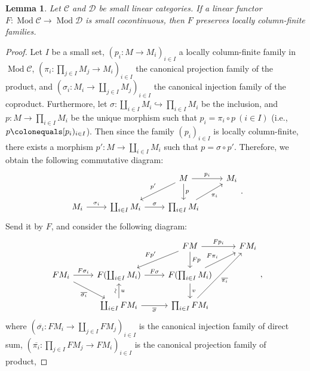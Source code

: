 \documentclass{surv-l}
\numberwithin{equation}{chapter}
\numberwithin{figure}{chapter}
\theoremstyle{plain}
\newtheorem{lem}[thm]{Lemma}
\theoremstyle{definition}
\theoremstyle{remark}
\newcommand{\Ar}[3]{\ar[from={#1}, to={#2}, #3]}
\DeclareMathOperator{\Mod}{Mod}
\begin{document}
\begin{lem}\label{lem:coconti-preserve-loc-fin}
Let ${\mathcal{C}}$ and ${\mathcal{D}}$ be small linear categories.
If a linear functor $F \colon \Mod{\mathcal{C}} \to \Mod{\mathcal{D}}$ is small cocontinuous, then
$F$ preserves locally column-finite families.
\end{lem}

\begin{proof}
Let $I$ be a small set,
$(p_i \colon M \to M_i)_{i\in I}$ a locally column-finite family in $\Mod{\mathcal{C}}$,
$(\pi_i \colon \prod_{j\in I}M_j \to M_i)_{i\in I}$ the canonical projection family of
the product, and
$(\sigma_i \colon M_i \to \coprod_{j\in I}M_j)_{i\in I}$ the canonical injection family
of the coproduct.
Furthermore, let
$\sigma \colon \coprod_{i\in I}M_i \hookrightarrow \prod_{i\in I}M_i$
be the inclusion, and
$p \colon M \to \prod_{i\in I}M_i$ be
the unique morphism such that $p_i = \pi_i \circ p\ (i \in I)$
(i.e., $p\colonequals  [p_i)_{i\in I}$). Then since the family $(p_i)_{i\in I}$ is locally column-finite,
there exists a morphism $p'\colon M \to \coprod_{i\in I}M_i$ such that
$p = \sigma \circ p'$.
Therefore, we obtain the following commutative diagram:
\[
\begin{tikzcd}
& & M & M_i\\
M_i & \coprod_{i\in I}M_i & \prod_{i\in I}M_i
\Ar{1-3}{1-4}{"p_i"}
\Ar{1-3}{2-2}{"p'" '}
\Ar{1-3}{2-3}{"p"}
\Ar{2-1}{2-2}{"\sigma_i"}
\Ar{2-2}{2-3}{"\sigma"}
\Ar{2-3}{1-4}{"\pi_i" '}
\end{tikzcd}.
\]
Send it by $F$, and consider the following diagram:
\begin{equation}\label{eq:kakudaizusiki}
\begin{tikzcd}
& & FM & FM_i\\
FM_i & F(\coprod_{i\in I}M_i) & F(\prod_{i\in I}M_i)\\
& \coprod_{i\in I}FM_i & \prod_{i\in I}FM_i
\Ar{1-3}{1-4}{"Fp_i"}
\Ar{1-3}{2-2}{"Fp'" '}
\Ar{1-3}{2-3}{"Fp"}
\Ar{2-1}{2-2}{"F\sigma_i"}
\Ar{2-2}{2-3}{"F\sigma"}
\Ar{2-3}{1-4}{"F\pi_i"}
\Ar{2-1}{3-2}{"\overline{\sigma_i}" '}
\Ar{3-2}{3-3}{"\overline{\sigma}" '}
\Ar{3-3}{1-4}{"\overline{\pi_i}" '}
\Ar{3-2}{2-2}{"u" ', "\rotatebox{90}{$\sim$}"}
\Ar{2-3}{3-3}{"v"}
\end{tikzcd},
\end{equation}
where $(\overline{\sigma_i} \colon FM_i \to \coprod_{j\in I}FM_j)_{i\in I}$ is the canonical injection family of direct sum,
$(\overline{\pi_i} \colon \prod_{j\in I}FM_j \to FM_i)_{i\in I}$ is the canonical projection family of product,

\end{proof}
\end{document}
